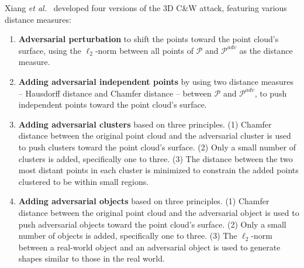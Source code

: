 \documentclass{ieeeaccess}
\def\etal{\textit{et al.}}
\begin{document}

Xiang \etal~\cite{xiang2019generating} developed four versions of the 3D C\&W attack, featuring various %
distance measures:

\begin{enumerate}

    \item \textbf{Adversarial perturbation} to shift the points toward the point cloud's surface, using the $\ell_2$-norm between all points of $\mathcal{P}$ and $\mathcal{P}^{adv}$ as the distance measure.
    
    \item \textbf{Adding adversarial independent points} by using two distance measures -- Hausdorff distance and Chamfer distance -- between $\mathcal{P}$ and $\mathcal{P}^{adv}$, to push independent points toward the point cloud's surface.

      
    \item \textbf{Adding adversarial clusters} based on three principles. %
    (1) Chamfer distance between the original point cloud and the adversarial cluster is used to push clusters toward the point cloud's surface.
    (2) Only a small number of clusters is added, specifically one to three. %
    (3) %
    The distance between the two most distant points in each cluster is minimized to constrain the added points clustered to be within small regions.
    
    \item \textbf{Adding adversarial objects} based on three principles.
    (1) Chamfer distance between the original point cloud and the adversarial object is used to push adversarial objects toward the point cloud's surface.
    (2) Only a small number of objects is added, specifically one to three. %
    (3) The $\ell_2$-norm between a real-world object and an adversarial object is used to generate shapes similar to those in the real world.
\end{enumerate}
\end{document}
